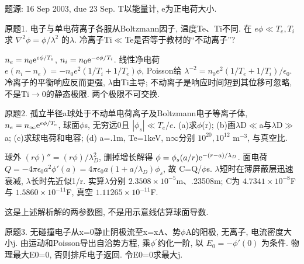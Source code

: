 题源: 16 Sep 2003, due 23 Sep. T以能量计, e为正电荷大小.
\begin{exercise}\label{ex:03-2-1}
原题1. 电子与单电荷离子各服从Boltzmann因子, 温度Te、Ti不同. 在 $e\phi\ll T_e,T_i$ 求 $\nabla^2\phi=\phi/\lambda^2$ 的\ensuremath{\lambda}. 冷离子Ti\ensuremath{\ll}Te是否等于教材的``不动离子''?
\end{exercise}
\begin{solution}
$n_e=n_0\mathrm e^{e\phi/T_e}$, $n_i=n_0\mathrm e^{-e\phi/T_i}$. 线性净电荷 $e(n_i-n_e)=-n_0e^2(1/T_i+1/T_e)\phi$, Poisson给 $\lambda^{-2}=n_0e^2(1/T_e+1/T_i)/\epsilon_0$. 冷离子的平衡响应反而更强, \ensuremath{\lambda}由Ti主导; 不动离子是响应时间短到其位移可忽略, 不是Ti\ensuremath{\to}0的静态极限. 两个极限不可交换.
\end{solution}
\begin{exercise}\label{ex:03-2-2}
原题2. 孤立半径a球处于不动单电荷离子及Boltzmann电子等离子体, $n_e=n_\infty\mathrm e^{e\phi/T_e}$, 球面\ensuremath{\phi}s, 无穷远0且 $|\phi_s|\ll T_e/e$. (a)求\ensuremath{\phi}(r); (b)画\ensuremath{\lambda}D\ensuremath{\ll}a与\ensuremath{\lambda}D\ensuremath{\gg}a; (c)求球电荷和电容; (d) a=.1m, Te=1keV, n\ensuremath{\infty}分别 $10^{20},10^{12}$ m$^{-3}$, 与真空比.
\end{exercise}
\begin{solution}
球外 $(r\phi)''=(r\phi)/\lambda_D^2$, 删掉增长解得 $\phi=\phi_s(a/r)\mathrm e^{-(r-a)/\lambda_D}$. 面电荷 $Q=-4\pi\epsilon_0a^2\phi'(a)=4\pi\epsilon_0a(1+a/\lambda_D)\phi_s$, 故 C=Q/\ensuremath{\phi}s. \ensuremath{\lambda}短时在薄屏蔽层迅速衰减, \ensuremath{\lambda}长时先近似1/r. 实算\ensuremath{\lambda}分别 $2.3508\times10^{-5}$m、.23508m; C为 $4.7341\times10^{-8}$F与 $1.5860\times10^{-11}$F, 真空 $1.11265\times10^{-11}$F.
\begin{center}\end{center}
这是上述解析解的两参数图, 不是用示意线估算球面导数.
\end{solution}
\begin{exercise}\label{ex:03-2-3}
原题3. 无碰撞电子从x=0静止阴极流至x=xA、势\ensuremath{\phi}A的阳极, 无离子, 电流密度大小j. 由运动和Poisson导出自洽势方程, 乘\ensuremath{\phi}\ensuremath{{}^{\prime}}约化一阶, 以 $E_0=-\phi'(0)$ 为条件. 物理最大E0=0, 否则排斥电子返回. 令E0=0求最大j.
\end{exercise}
